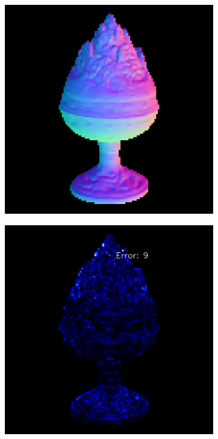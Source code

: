 \begin{figure}
\begin{subfigure}[b]{0.19\linewidth}
	\end{subfigure}
	\begin{subfigure}[b]{0.19\linewidth}
		\includegraphics[width=\linewidth]{./Figures/gcnn_synthetic/fancy_eval_2_normal_an2-8-1000.png}
	\end{subfigure}
	\begin{subfigure}[b]{0.19\linewidth}
		\includegraphics[width=\linewidth]{./Figures/gcnn_synthetic/fancy_eval_2_error_an2-8-1000.png}
	\end{subfigure}
	

\end{figure}
